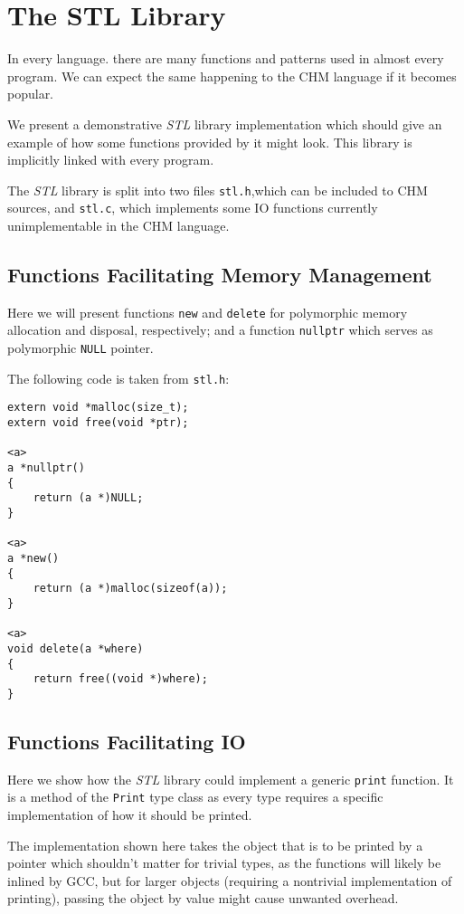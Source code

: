 \chapter{The STL Library}
\label{stl}

In every language. there are many functions and patterns used in almost every program. We can expect the same happening to the CHM language if it becomes popular.

We present a demonstrative \emph{STL} library implementation which should give an example of how some functions provided by it might look. This library is implicitly linked with every program.

The \emph{STL} library is split into two files \lstinline[language=sh]{stl.h},which can be included to CHM sources, and \lstinline[language=sh]{stl.c}, which implements some IO functions currently unimplementable in the CHM language.

\section{Functions Facilitating Memory Management}

Here we will present functions \lstinline{new} and \lstinline{delete} for polymorphic memory allocation and disposal, respectively; and a function \lstinline{nullptr} which serves as polymorphic \lstinline{NULL} pointer.

The following code is taken from \lstinline[language=sh]{stl.h}:

\begin{lstlisting}
extern void *malloc(size_t);
extern void free(void *ptr);

<a>
a *nullptr()
{
    return (a *)NULL;
}

<a>
a *new()
{
    return (a *)malloc(sizeof(a));
}

<a>
void delete(a *where)
{
    return free((void *)where);
}
\end{lstlisting}

\section{Functions Facilitating IO}

Here we show how the \emph{STL} library could implement a generic \lstinline{print} function. It is a method of the \lstinline{Print} type class as every type requires a specific implementation of how it should be printed.

The implementation shown here takes the object that is to be printed by a pointer which shouldn't matter for trivial types, as the functions will likely be inlined by GCC, but for larger objects (requiring a nontrivial implementation of printing), passing the object by value might cause unwanted overhead.

